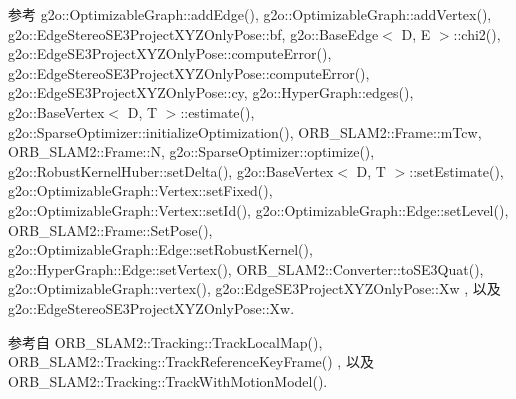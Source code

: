 参考 g2o\-::\-Optimizable\-Graph\-::add\-Edge(), g2o\-::\-Optimizable\-Graph\-::add\-Vertex(), g2o\-::\-Edge\-Stereo\-S\-E3\-Project\-X\-Y\-Z\-Only\-Pose\-::bf, g2o\-::\-Base\-Edge$<$ D, E $>$\-::chi2(), g2o\-::\-Edge\-S\-E3\-Project\-X\-Y\-Z\-Only\-Pose\-::compute\-Error(), g2o\-::\-Edge\-Stereo\-S\-E3\-Project\-X\-Y\-Z\-Only\-Pose\-::compute\-Error(), g2o\-::\-Edge\-S\-E3\-Project\-X\-Y\-Z\-Only\-Pose\-::cy, g2o\-::\-Hyper\-Graph\-::edges(), g2o\-::\-Base\-Vertex$<$ D, T $>$\-::estimate(), g2o\-::\-Sparse\-Optimizer\-::initialize\-Optimization(), O\-R\-B\-\_\-\-S\-L\-A\-M2\-::\-Frame\-::m\-Tcw, O\-R\-B\-\_\-\-S\-L\-A\-M2\-::\-Frame\-::\-N, g2o\-::\-Sparse\-Optimizer\-::optimize(), g2o\-::\-Robust\-Kernel\-Huber\-::set\-Delta(), g2o\-::\-Base\-Vertex$<$ D, T $>$\-::set\-Estimate(), g2o\-::\-Optimizable\-Graph\-::\-Vertex\-::set\-Fixed(), g2o\-::\-Optimizable\-Graph\-::\-Vertex\-::set\-Id(), g2o\-::\-Optimizable\-Graph\-::\-Edge\-::set\-Level(), O\-R\-B\-\_\-\-S\-L\-A\-M2\-::\-Frame\-::\-Set\-Pose(), g2o\-::\-Optimizable\-Graph\-::\-Edge\-::set\-Robust\-Kernel(), g2o\-::\-Hyper\-Graph\-::\-Edge\-::set\-Vertex(), O\-R\-B\-\_\-\-S\-L\-A\-M2\-::\-Converter\-::to\-S\-E3\-Quat(), g2o\-::\-Optimizable\-Graph\-::vertex(), g2o\-::\-Edge\-S\-E3\-Project\-X\-Y\-Z\-Only\-Pose\-::\-Xw , 以及 g2o\-::\-Edge\-Stereo\-S\-E3\-Project\-X\-Y\-Z\-Only\-Pose\-::\-Xw.



参考自 O\-R\-B\-\_\-\-S\-L\-A\-M2\-::\-Tracking\-::\-Track\-Local\-Map(), O\-R\-B\-\_\-\-S\-L\-A\-M2\-::\-Tracking\-::\-Track\-Reference\-Key\-Frame() , 以及 O\-R\-B\-\_\-\-S\-L\-A\-M2\-::\-Tracking\-::\-Track\-With\-Motion\-Model().



